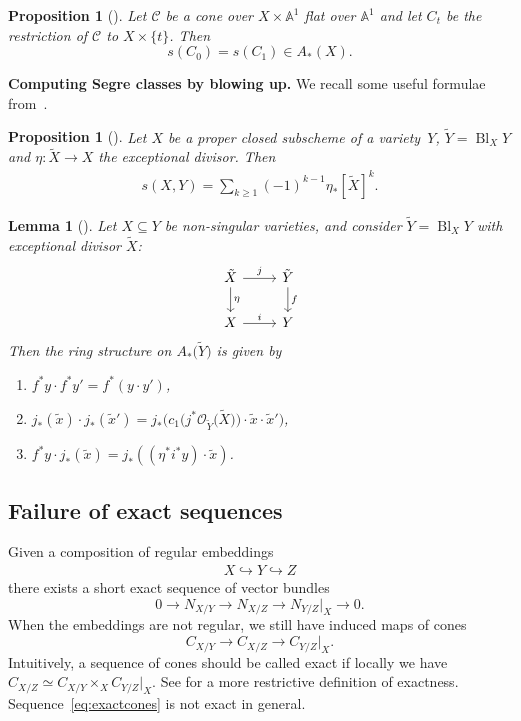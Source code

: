 \documentclass[pdftex]{sigma}
\numberwithin{equation}{section}
\newtheorem{Lemma}[Theorem]{Lemma}
\newtheorem{Proposition}[Theorem]{Proposition}
 { \theoremstyle{definition}
\newtheorem{Definition}[Theorem]{Definition}
\newtheorem{Note}[Theorem]{Note}
\newtheorem{Example}[Theorem]{Example}
\newtheorem{Remark}[Theorem]{Remark}
\newtheorem{notation}[Theorem]{Notation}
\newtheorem{construction}[Theorem]{Construction}
}
\theoremstyle{plain}
\theoremstyle{definition}
\theoremstyle{remark}
\begin{document}
\begin{Proposition}[{\cite[Examples~4.1.6, 10.1.10]{Fulton}}]\label{Segre constant}
Let $\mathcal{C}$ be a cone over $X\times \mathbb{A}^1$ flat over $\mathbb{A}^1$ and let $C_t$ be the restriction of $\mathcal C$ to $X\times\{t\}$. Then
\[
s(C_0)=s(C_1) \in A_*(X).
\]
\end{Proposition}

{\bf Computing Segre classes by blowing up.} We recall some useful formulae from~\cite{Fulton}.

\begin{Proposition}[{\cite[Corollary 4.2.2]{Fulton}}]\label{prop2}
Let $X$ be a proper closed subscheme of a variety~$Y$, $ \tilde{Y}=\operatorname{Bl}_X Y$ and $\eta\colon\tilde{X}\to X$ the exceptional divisor. Then
\begin{gather}\label{prop2-eq}s(X,Y)=\sum_{k\geq 1}{(-1)^{k-1}\eta_*[\tilde{X}]^k}.\end{gather}
\end{Proposition}

\begin{Lemma}[{\cite[Example~8.3.9]{Fulton}}]\label{blup_formulas}
Let $X\subseteq Y$ be non-singular varieties, and consider $\tilde{Y}=\operatorname{Bl}_X Y$ with exceptional divisor $\tilde{X}$:
\[
\begin{tikzcd}
\tilde{X}\ar[r,"j"]\ar[d,"\eta"] & \tilde{Y}\ar[d,"f"] \\
X\ar[r,"i"] & Y
\end{tikzcd}
\]
Then the ring structure on $A_*\big(\tilde{Y}\big)$ is given by
\begin{enumerate}\itemsep=0pt
\item[$(i)$] $f^*y\cdot f^* y'=f^*(y\cdot y')$,
\item[$(ii)$] $j_*(\tilde{x})\cdot j_*(\tilde{x}')=j_*\big(c_1\big(j^*\mathcal O_{\tilde{Y}}\big(\tilde{X}\big)\big)\cdot \tilde{x}\cdot \tilde{x}'\big)$,
\item[$(iii)$] $f^*y\cdot j_*(\tilde{x})=j_*((\eta^* i^* y)\cdot\tilde{x})$.
\end{enumerate}			
\end{Lemma}

\subsection{Failure of exact sequences}	
Given a composition of regular embeddings \begin{gather*}X\hookrightarrow Y\hookrightarrow Z\end{gather*} there exists a short exact sequence of vector bundles
\[0\to N_{X/Y}\to N_{X/Z}\to N_{Y/Z}\rvert_X\to 0.\]
When the embeddings are not regular, we still have induced maps of cones
\begin{equation}\label{eq:exactcones}
C_{X/Y}\to C_{X/Z}\to C_{Y/Z}\rvert_X.\end{equation}
Intuitively, a sequence of cones should be called exact if locally we have $C_{X/Z}\simeq C_{X/Y}\times_X C_{Y/Z}\rvert_X$. See \cite[Example~4.1.6]{Fulton} for a more restrictive definition of exactness. Sequence~\eqref{eq:exactcones} is not exact in general.
\end{document}
